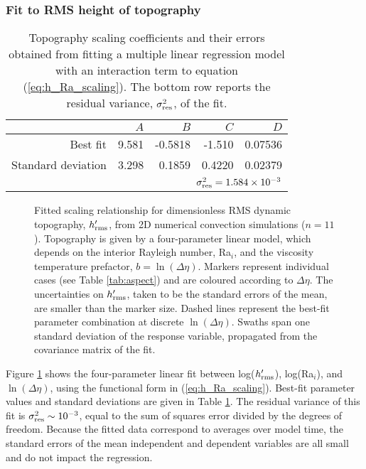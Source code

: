 \documentclass[trackchanges]{aastex63}
\newcommand{\todo}[1]{\textit{\textcolor{violet}{{#1}}}}
\begin{document}



\subsubsection{Fit to RMS height of topography} \label{sec:results-scaling}


\begin{table}
\centering
\caption{Topography scaling coefficients and their errors obtained from fitting a multiple linear regression model with an interaction term to equation (\ref{eq:h_Ra_scaling}). The bottom row reports the residual variance, $\sigma^2_{\rm res}$, of the fit. \label{tab:fit}}
\footnotesize
\begin{tabular}{@{} r r r r r  @{}}
\toprule
& $A$ & $B$ & $C$ & $D$ \\
\midrule
Best fit & 9.581 & -0.5818 & -1.510 & 0.07536 \\
Standard deviation & 3.298 & 0.1859 & 0.4220 & 0.02379 \\
\midrule
\multicolumn{5}{r}{$\sigma^2_{\rm res} = 1.584 \times 10^{-3}$} \\
\end{tabular}
\end{table}

\begin{figure*}
    \centering
    \caption{Fitted scaling relationship for dimensionless RMS dynamic topography, $h^\prime_{\rm rms}$, from 2D numerical convection simulations ($n=11$). Topography is given by a four-parameter linear model, which depends on the interior Rayleigh number, Ra$_i$, and the viscosity temperature prefactor, $b = \ln(\Delta \eta)$. Markers represent individual cases (see Table \ref{tab:aspect}) and are coloured according to $\Delta \eta$. The uncertainties on $h^\prime_{\rm rms}$, taken to be the standard errors of the mean, are smaller than the marker size. Dashed lines represent the best-fit parameter combination at discrete $\ln(\Delta \eta)$. Swaths span one standard deviation of the response variable, propagated from the covariance matrix of the fit.}
    \label{fig:2D-h-scale}
\end{figure*}

Figure \ref{fig:2D-h-scale} shows the four-parameter linear fit between log($h_{\rm rms}^\prime$), log(Ra$_i$), and $\ln(\Delta \eta)$, using the functional form in (\ref{eq:h_Ra_scaling}). Best-fit parameter values and standard deviations are given in Table \ref{tab:fit}. The residual variance of this fit is $\sigma^2_{\rm res} \sim 10^{-3}$, equal to the sum of squares error divided by the degrees of freedom. Because the fitted data correspond to averages over model time, the standard errors of the mean independent and dependent variables are all small and do not impact the regression. 
\end{document}
